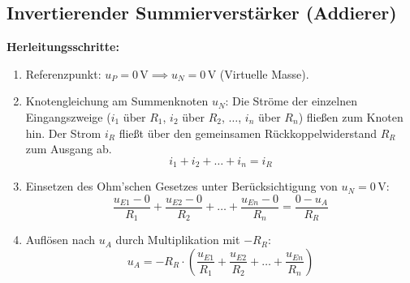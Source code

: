 \documentclass[11pt,a4paper]{article}
\begin{document}
\subsection{Invertierender Summierverstärker (Addierer)}
\textbf{Herleitungsschritte:}
\begin{enumerate}
    \item Referenzpunkt: $u_P = 0\,\text{V} \implies u_N = 0\,\text{V}$ (Virtuelle Masse).
    \item Knotengleichung am Summenknoten $u_N$: Die Ströme der einzelnen Eingangszweige ($i_1$ über $R_1$, $i_2$ über $R_2$, $\dots$, $i_n$ über $R_n$) fließen zum Knoten hin. Der Strom $i_R$ fließt über den gemeinsamen Rückkoppelwiderstand $R_R$ zum Ausgang ab.
    \begin{equation}
    i_1 + i_2 + \dots + i_n = i_R
    \end{equation}
    \item Einsetzen des Ohm'schen Gesetzes unter Berücksichtigung von $u_N = 0\,\text{V}$:
    \begin{equation}
    \frac{u_{E1} - 0}{R_1} + \frac{u_{E2} - 0}{R_2} + \dots + \frac{u_{En} - 0}{R_n} = \frac{0 - u_A}{R_R}
    \end{equation}
    \item Auflösen nach $u_A$ durch Multiplikation mit $-R_R$:
    \begin{equation}
    u_A = -R_R \cdot \left( \frac{u_{E1}}{R_1} + \frac{u_{E2}}{R_2} + \dots + \frac{u_{En}}{R_n} \right)
    \end{equation}
\end{enumerate}
\end{document}
